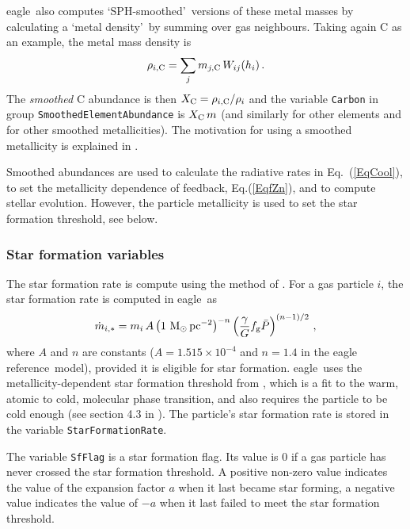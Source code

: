 \documentclass[10pt, a4paper]{article}
\newcommand{\eagle}{{\sc eagle}}
\newcommand{\REF}{{\sc eagle reference}}
\begin{document}
\eagle\ also computes \lq SPH-smoothed\rq\ versions of these metal masses by
calculating a \lq metal density\rq\ by summing over gas neighbours. Taking
again C as an example, the metal mass density is \begin{equation} \rho_{i, {\rm
C}} = \sum_j m_{j, {\rm C}}\,W_{ij}(h_i)\,.  \end{equation} The {\em smoothed}
C abundance is then $X_{\rm C}=\rho_{i, {\rm C}}/\rho_i$ and the variable
\texttt{Carbon} in group \texttt{SmoothedElementAbundance} is $X_{\rm C}\,m$
(and similarly for other elements and for other smoothed metallicities). The
motivation for using a smoothed metallicity is explained in \cite{2009MNRAS.399..574W}.

Smoothed abundances are used to calculate the radiative rates in
Eq.~(\ref{EqCool}), to set the metallicity dependence of feedback,
Eq.(\ref{EqfZn}), and to compute stellar evolution. However, the particle
metallicity is used to set the star formation threshold, see below.

\subsubsection{Star formation variables}
\label{SecSFR}
The star formation rate is compute using the method of \cite{2008MNRAS.383.1210S}. For a
gas particle $i$, the star formation rate is computed in \eagle\ as
\begin{equation} \dot{m}_{i,\ast} = m_i\, A \left (1~{\rm M}_\odot\,{\rm
pc}^{-2}\right)^{-n} \left ({\gamma \over G} f_{\rm g}
\bar{P}\right)^{(n-1)/2}\,, \label{EqSFLaw} \end{equation} where $A$ and $n$
are constants ($A=1.515\times 10^{-4}$ and $n=1.4$ in the \REF\
model), provided it is eligible for star formation. \eagle\ uses the
metallicity-dependent star formation threshold from \cite{2004ApJ...609..667S}, which is
a fit to the warm, atomic to cold, molecular phase transition, and also
requires the particle to be cold enough (see section 4.3 in \cite{2015MNRAS.446..521S}).
The particle's star formation rate is stored in the variable
\texttt{StarFormationRate}.

The variable \texttt{SfFlag} is a star formation
flag. Its value is 0 if a gas particle has never crossed the star formation
threshold. A positive non-zero value indicates the value of the expansion
factor $a$ when it last became star forming, a negative value indicates the
value of $-a$ when it last failed to meet the star formation threshold.
\end{document}
